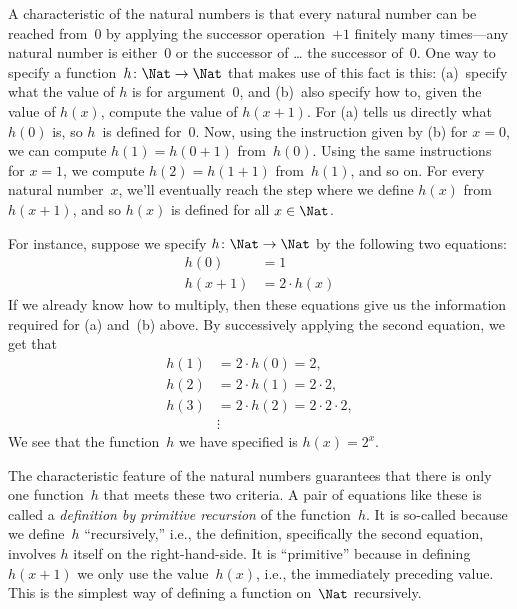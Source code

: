\documentclass[../../../include/open-logic-section]{subfiles}
\begin{document}

A characteristic of the natural numbers is that every natural number
can be reached from~$0$ by applying the successor operation~$+1$
finitely many times---any natural number is either~$0$ or the
successor of \dots{} the successor of~$0$. One way to specify a
function~$h\colon\Nat \to \Nat$ that makes use of this fact is this:
(a)~specify what the value of $h$ is for argument~$0$, and (b)~also
specify how to, given the value of $h(x)$, compute the value of
$h(x+1)$. For (a) tells us directly what $h(0)$ is, so $h$~is defined
for~$0$. Now, using the instruction given by (b) for $x=0$, we can
compute $h(1) = h(0+1)$ from~$h(0)$. Using the same instructions for
$x=1$, we compute $h(2) = h(1+1)$ from~$h(1)$, and so on. For every
natural number~$x$, we'll eventually reach the step where we define
$h(x)$ from $h(x+1)$, and so $h(x)$ is defined for all $x \in \Nat$.

For instance, suppose we specify $h\colon \Nat \to \Nat$ by the following
two equations:
\begin{align*}
h(0) & =  1\\
h(x+1) & =  2 \cdot h(x)
\end{align*}
If we already know how to multiply, then these equations give us the
information required for (a) and~(b) above. By successively applying
the second equation, we get that
\begin{align*}
  h(1) & = 2\cdot h(0) = 2,\\
  h(2) & = 2\cdot h(1) = 2\cdot 2,\\
  h(3) & = 2 \cdot h(2) = 2\cdot 2 \cdot 2,\\
  & \vdots
\end{align*}
We see that the function~$h$ we have specified is $h(x) = 2^x$.

The characteristic feature of the natural numbers guarantees that
there is only one function~$h$ that meets these two criteria.  A pair
of equations like these is called a \emph{definition by primitive
recursion} of the function~$h$. It is so-called because we define~$h$
``recursively,'' i.e., the definition, specifically the second
equation, involves $h$ itself on the right-hand-side. It is
``primitive'' because in defining $h(x+1)$ we only use the
value~$h(x)$, i.e., the immediately preceding value. This is the
simplest way of defining a function on~$\Nat$ recursively.
\end{document}
